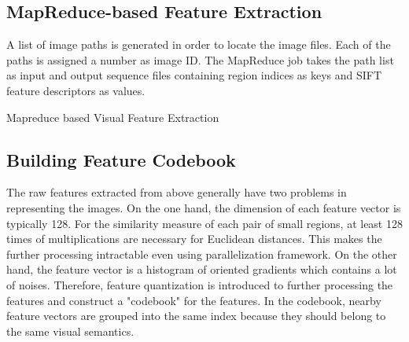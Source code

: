 \documentclass{acm_proc_article-sp}
\begin{document}
\subsection{MapReduce-based Feature Extraction}
A list of image paths is generated in order to locate the image files. Each of the paths is assigned a number as image ID. The MapReduce job takes the path list as input and output sequence files containing region indices as keys and SIFT feature descriptors as values.
\begin{algorithm}[!htb]
\SetAlgoVlined
{}
\caption{Mapreduce based Visual Feature Extraction}
\end{algorithm}


\subsection{Building Feature Codebook}
The raw features extracted from above generally have two problems in representing the images. On the one hand, the dimension of each feature vector is typically 128. For the similarity measure of each pair of small regions, at least 128 times of multiplications are necessary for Euclidean distances. This makes the further processing intractable even using parallelization framework. On the other hand, the feature vector is a histogram of oriented gradients which contains a lot of noises. Therefore, feature quantization is introduced to further processing the features and construct a "codebook" for the features. In the codebook, nearby feature vectors are grouped into the same index because they should belong to the same visual semantics.
\end{document}
